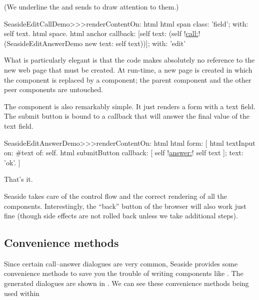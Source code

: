 \documentclass[a4paper,10pt,twoside]{book}
\begin{document}
{{(We underline the  and  sends to draw attention to them.)

\begin{code}{}
SeasideEditCallDemo>>>renderContentOn: html 
	html span
		class: 'field';
		with: self text.
	html space.
	html anchor
		callback: [self text: (self !\underline{call:}! (SeasideEditAnswerDemo new text: self text))];
		with: 'edit'
\end{code}{}

What is particularly elegant is that the code makes absolutely no reference to the new web page that must be created.
At run-time, a new page is created in which the  component is replaced by a  component; the parent component and the other peer components are untouched.


The  component is also remarkably simple.
It just renders a form with a text field.
The submit button is bound to a callback that will answer the final value of the text field.

\begin{code}{}
SeasideEditAnswerDemo>>>renderContentOn: html
	html form: [
		html textInput
			on: #text of: self.
		html submitButton
			callback: [ self !\underline{answer:}! self text ];
			text: 'ok'.
		]
\end{code}{}

That's it.

Seaside takes care of the control flow and the correct rendering of all the components.
Interestingly, the ``back'' button of the browser will also work just fine (though side effects are not rolled back unless we take additional steps).

\subsection{Convenience methods}

Since certain call--answer dialogues are very common, Seaside provides some convenience methods to save you the trouble of writing components like .
The generated dialogues are shown in .
We can see these convenience methods being used within 

}}
\end{document}

